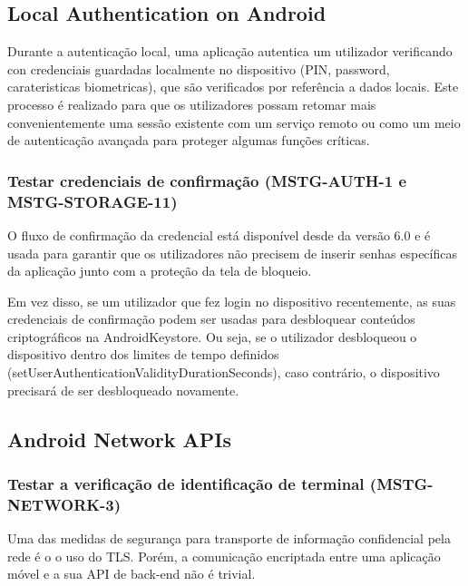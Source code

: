 \subsection{Local Authentication on Android}
\par Durante a autenticação local, uma aplicação autentica um utilizador verificando con credenciais guardadas localmente no dispositivo (PIN, password, carateristicas biometricas), que são verificados por referência a dados locais. Este processo é realizado para que os utilizadores possam retomar mais convenientemente uma sessão existente com um serviço remoto ou como um meio de autenticação avançada para proteger algumas funções críticas.



\subsubsection{Testar credenciais de confirmação (MSTG-AUTH-1 e MSTG-STORAGE-11)}
\par O fluxo de confirmação da credencial está disponível desde da versão 6.0 e é usada para garantir que os utilizadores não precisem de inserir senhas específicas da aplicação junto com a proteção da tela de bloqueio. 

\par Em vez disso, se um utilizador que fez login no dispositivo recentemente, as suas credenciais de confirmação podem ser usadas para desbloquear conteúdos criptográficos na AndroidKeystore. Ou seja, se o utilizador desbloqueou o dispositivo dentro dos limites de tempo definidos (setUserAuthenticationValidityDurationSeconds), caso contrário, o dispositivo precisará de ser desbloqueado novamente.





\subsection{Android Network APIs}

\subsubsection{Testar a verificação de identificação de terminal (MSTG-NETWORK-3)}
\par Uma das medidas de segurança para transporte de informação confidencial pela rede é o o uso do TLS. Porém, a comunicação encriptada entre uma aplicação móvel e a sua API de back-end não é trivial. 

